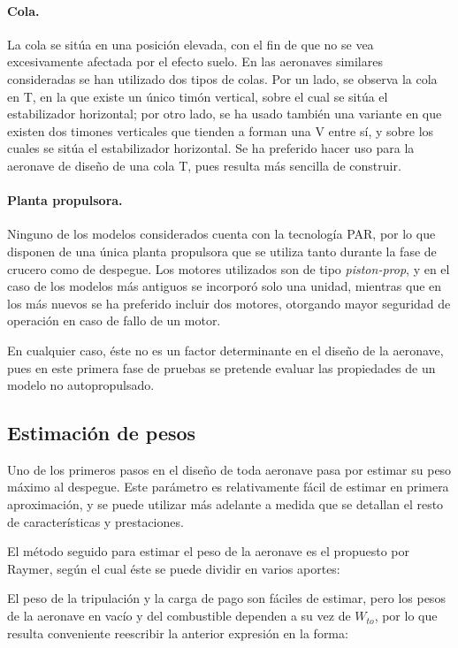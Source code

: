 \paragraph{Cola.} La cola se sitúa en una posición elevada, con el fin de que no se vea excesivamente afectada por el efecto suelo. En las aeronaves similares consideradas se han utilizado dos tipos de colas. Por un lado, se observa la cola en T, en la que existe un único timón vertical, sobre el cual se sitúa el estabilizador horizontal; por otro lado, se ha usado también una variante en que existen dos timones verticales que tienden a forman una V entre sí, y sobre los cuales se sitúa el estabilizador horizontal. Se ha preferido hacer uso para la aeronave de diseño de una cola T, pues resulta más sencilla de construir.

\paragraph{Planta propulsora.} Ninguno de los modelos considerados cuenta con la tecnología PAR, por lo que disponen de una única planta propulsora que se utiliza tanto durante la fase de crucero como de despegue. Los motores utilizados son de tipo \emph{piston-prop}, y en el caso de los modelos más antiguos se incorporó solo una unidad, mientras que en los más nuevos se ha preferido incluir dos motores, otorgando mayor seguridad de operación en caso de fallo de un motor.

En cualquier caso, éste no es un factor determinante en el diseño de la aeronave, pues en este primera fase de pruebas se pretende evaluar las propiedades de un modelo no autopropulsado.


\subsection{Estimación de pesos}
\label{sec:design:weights}

Uno de los primeros pasos en el diseño de toda aeronave pasa por estimar su peso máximo al despegue. Este parámetro es relativamente fácil de estimar en primera aproximación, y se puede utilizar más adelante a medida que se detallan el resto de características y prestaciones.

El método seguido para estimar el peso de la aeronave es el propuesto por Raymer\cite{ref:raymer}, según el cual éste se puede dividir en varios aportes:

El peso de la tripulación y la carga de pago son fáciles de estimar, pero los pesos de la aeronave en vacío y del combustible dependen a su vez de $W_{to}$, por lo que resulta conveniente reescribir la anterior expresión en la forma:

